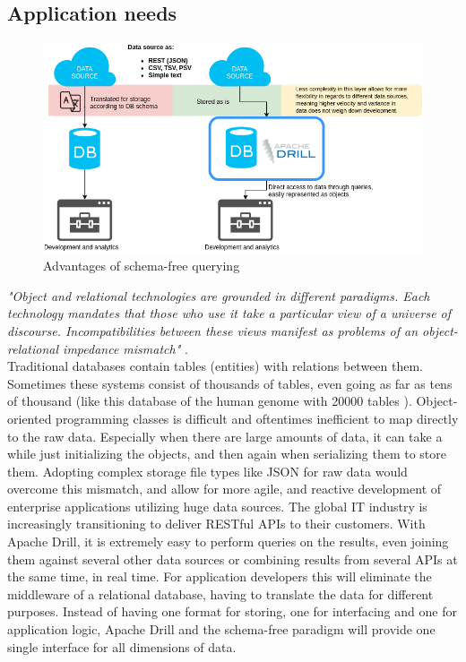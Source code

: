 \documentclass[a4paper,english]{report}
\begin{document}
			\subsection{Application needs}
			\begin{figure}[h]
					\includegraphics[width=\textwidth]{drill_advantages}
					\caption{Advantages of schema-free querying}
			\end{figure}
			\textit{"Object and relational technologies are grounded in
			different paradigms. Each technology mandates that
			those who use it take a particular view of a universe
			of discourse. Incompatibilities between these views
			manifest as problems of an object-relational
			impedance mismatch"} \cite{impedance}.
			\\
			Traditional databases contain tables (entities) with relations between them. Sometimes these systems consist of thousands of tables, even going as far as tens of thousand (like this database of the human genome with 20000 tables \cite{humangenome}). Object-oriented programming classes is difficult and oftentimes inefficient to map directly to the raw data. Especially when there are large amounts of data, it can take a while just initializing the objects, and then again when serializing them to store them. Adopting complex storage file types like JSON for raw data would overcome this mismatch, and allow for more agile, and reactive development of enterprise applications utilizing huge data sources. The global IT industry is increasingly transitioning to deliver RESTful APIs to their customers. With Apache Drill, it is extremely easy to perform queries on the results, even joining them against several other data sources or combining results from several APIs at the same time, in real time. For application developers this will eliminate the middleware of a relational database, having to translate the data for different purposes. Instead of having one format for storing, one for interfacing and one for application logic, Apache Drill and the schema-free paradigm will provide one single interface for all dimensions of data.
		
\end{document}
